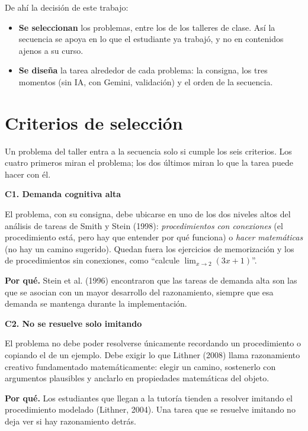 \documentclass[11pt,letterpaper]{article}
\newenvironment{caja}[1]{\par\medskip\noindent\textbf{#1}\par\smallskip\noindent\ignorespaces}{\par\medskip}
\begin{document}
De ahí la decisión de este trabajo:

\begin{itemize}
  \item \textbf{Se seleccionan} los problemas, entre los de los talleres de clase. Así la secuencia se apoya en lo que el estudiante ya trabajó, y no en contenidos ajenos a su curso.
  \item \textbf{Se diseña} la tarea alrededor de cada problema: la consigna, los tres momentos (sin IA, con Gemini, validación) y el orden de la secuencia.
\end{itemize}

\section{Criterios de selección}
\label{sec:criterios}

Un problema del taller entra a la secuencia solo si cumple los seis criterios. Los cuatro primeros miran el problema; los dos últimos miran lo que la tarea puede hacer con él.

\begin{caja}{C1. Demanda cognitiva alta}
El problema, con su consigna, debe ubicarse en uno de los dos niveles altos del análisis de tareas de Smith y Stein (1998): \emph{procedimientos con conexiones} (el procedimiento está, pero hay que entender por qué funciona) o \emph{hacer matemáticas} (no hay un camino sugerido). Quedan fuera los ejercicios de memorización y los de procedimientos sin conexiones, como ``calcule $\lim_{x\to 2}(3x+1)$''.

\textbf{Por qué.} Stein et al. (1996) encontraron que las tareas de demanda alta son las que se asocian con un mayor desarrollo del razonamiento, siempre que esa demanda se mantenga durante la implementación.
\end{caja}

\begin{caja}{C2. No se resuelve solo imitando}
El problema no debe poder resolverse únicamente recordando un procedimiento o copiando el de un ejemplo. Debe exigir lo que Lithner (2008) llama razonamiento creativo fundamentado matemáticamente: elegir un camino, sostenerlo con argumentos plausibles y anclarlo en propiedades matemáticas del objeto.

\textbf{Por qué.} Los estudiantes que llegan a la tutoría tienden a resolver imitando el procedimiento modelado (Lithner, 2004). Una tarea que se resuelve imitando no deja ver si hay razonamiento detrás.
\end{caja}
\end{document}
